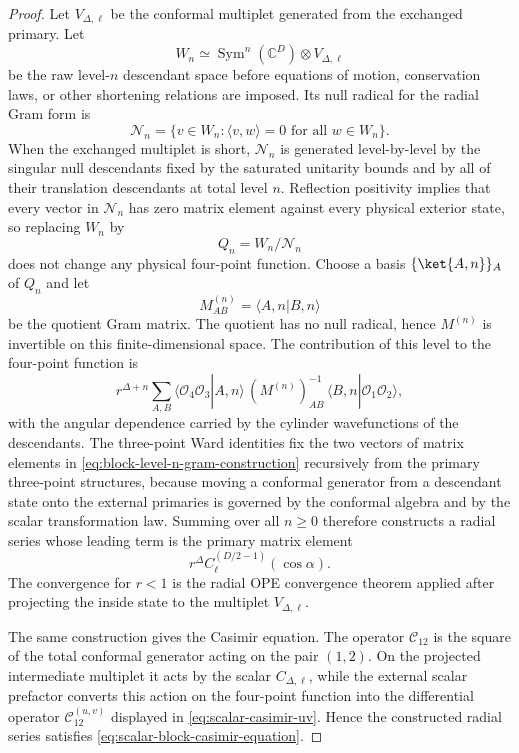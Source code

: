 \begin{proof}
Let \(V_{\Delta,\ell}\) be the conformal multiplet generated from the exchanged
primary.  Let
\[
  W_n\simeq \operatorname{Sym}^n(\mathbb C^D)\otimes V_{\Delta,\ell}
\]
be the raw level-\(n\) descendant space before equations of motion,
conservation laws, or other shortening relations are imposed.  Its null radical
for the radial Gram form is
\[
  \mathcal N_n
  =
  \{v\in W_n:\langle v,w\rangle=0\text{ for all }w\in W_n\}.
\]
When the exchanged multiplet is short, \(\mathcal N_n\) is generated
level-by-level by the singular null descendants fixed by the saturated
unitarity bounds and by all of their translation descendants at total level
\(n\).  Reflection positivity implies that every vector in \(\mathcal N_n\) has
zero matrix element against every physical exterior state, so replacing
\(W_n\) by
\[
  Q_n=W_n/\mathcal N_n
\]
does not change any physical four-point function.  Choose a basis
\(\{\ket{A,n}\}_A\) of \(Q_n\) and let
\[
  M^{(n)}_{AB}=\langle A,n|B,n\rangle
\]
be the quotient Gram matrix.  The quotient has no null radical, hence
\(M^{(n)}\) is invertible on this finite-dimensional space.  The contribution
of this level to the four-point function is
\begin{equation}
  r^{\Delta+n}
  \sum_{A,B}
  \langle \mathcal O_4\mathcal O_3|A,n\rangle\,
  (M^{(n)})^{-1}_{AB}\,
  \langle B,n|\mathcal O_1\mathcal O_2\rangle ,
  \label{eq:block-level-n-gram-construction}
\end{equation}
with the angular dependence carried by the cylinder wavefunctions of the
descendants.  The three-point Ward identities fix the two vectors of matrix
elements in \eqref{eq:block-level-n-gram-construction} recursively from the
primary three-point structures, because moving a conformal generator from a
descendant state onto the external primaries is governed by the conformal
algebra and by the scalar transformation law.  Summing over all \(n\geq0\)
therefore constructs a radial series whose leading term is the primary
matrix element
\[
  r^\Delta C_\ell^{(D/2-1)}(\cos\alpha).
\]
The convergence for \(r<1\) is the radial OPE convergence theorem applied after
projecting the inside state to the multiplet \(V_{\Delta,\ell}\).

The same construction gives the Casimir equation.  The operator
\(\mathcal C_{12}\) is the square of the total conformal generator acting on the
pair \((1,2)\).  On the projected intermediate multiplet it acts by the scalar
\(C_{\Delta,\ell}\), while the external scalar prefactor converts this action
on the four-point function into the differential operator
\(\mathcal C_{12}^{(u,v)}\) displayed in
\eqref{eq:scalar-casimir-uv}.  Hence the constructed radial series satisfies
\eqref{eq:scalar-block-casimir-equation}.


\end{proof}
